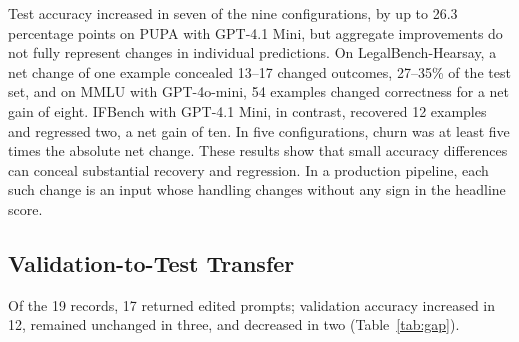 \documentclass[11pt]{article}
\begin{document}
Test accuracy increased in seven of the nine configurations, by up to 26.3 percentage points on PUPA with GPT-4.1 Mini, but aggregate improvements do not fully represent changes in individual predictions. On LegalBench-Hearsay, a net change of one example concealed 13--17 changed outcomes, 27--35\% of the test set, and on MMLU with GPT-4o-mini, 54 examples changed correctness for a net gain of eight. IFBench with GPT-4.1 Mini, in contrast, recovered 12 examples and regressed two, a net gain of ten. In five configurations, churn was at least five times the absolute net change. These results show that small accuracy differences can conceal substantial recovery and regression. In a production pipeline, each such change is an input whose handling changes without any sign in the headline score.

\subsection{Validation-to-Test Transfer}
\label{sec:valtest}

Of the 19 records, 17 returned edited prompts; validation accuracy increased in 12, remained unchanged in three, and decreased in two (Table~\ref{tab:gap}).

\begin{table}[!t]
\centering
\small
{}
\caption{Mean validation and test accuracy changes for 17 edited-prompt returns; two additional records retained the seed. Means weight runs equally and are reported in percentage points. The fourth column counts runs with improved validation accuracy but decreased test accuracy.}
\label{tab:gap}
\end{table}
\end{document}
